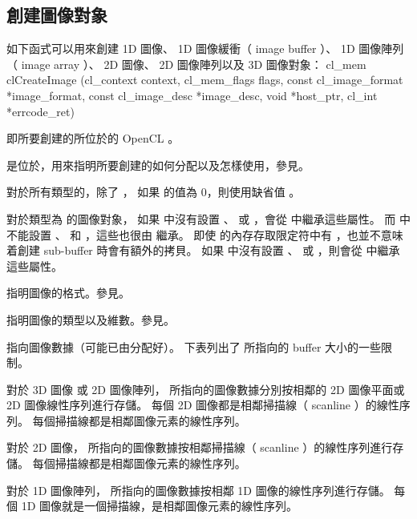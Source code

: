 \subsection{創建圖像對象}
如下函式可以用來創建 1D 圖像、 1D 圖像緩衝（ image buffer ）、 1D 圖像陣列（ image array ）、
2D 圖像、 2D 圖像陣列以及 3D 圖像對象：
\startCLFUNC
cl_mem clCreateImage (cl_context context,
		cl_mem_flags flags,
		const cl_image_format *image_format,
		const cl_image_desc *image_desc,
		void *host_ptr,
		cl_int *errcode_ret)
\stopCLFUNC

 即所要創建的所位於的 OpenCL 。

 是位於，用來指明所要創建的如何分配以及怎樣使用，參見。

對於所有類型的，除了 ，
如果  的值為 0，則使用缺省值 。

對於類型為  的圖像對象，
如果  中沒有設置 、  或 ，會從  中繼承這些屬性。
而  中不能設置 、  和 ，這些也很由  繼承。
即使  的內存存取限定符中有 ，也並不意味着創建 sub-buffer 時會有額外的拷貝。
如果  中沒有設置 、  或 ，則會從  中繼承這些屬性。

 指明圖像的格式。參見。

 指明圖像的類型以及維數。參見。

 指向圖像數據（可能已由分配好）。
下表列出了  所指向的 buffer 大小的一些限制。



對於 3D 圖像 或 2D 圖像陣列，  所指向的圖像數據分別按相鄰的 2D 圖像平面或 2D 圖像線性序列進行存儲。
每個 2D 圖像都是相鄰掃描線（ scanline ）的線性序列。
每個掃描線都是相鄰圖像元素的線性序列。

對於 2D 圖像，  所指向的圖像數據按相鄰掃描線（ scanline ）的線性序列進行存儲。
每個掃描線都是相鄰圖像元素的線性序列。

對於 1D 圖像陣列，  所指向的圖像數據按相鄰 1D 圖像的線性序列進行存儲。
每個 1D 圖像就是一個掃描線，是相鄰圖像元素的線性序列。

